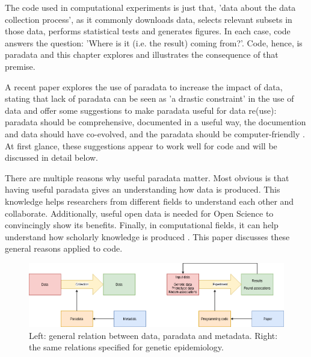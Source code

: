 
The code used in computational experiments is just that, 
'data about the data collection 
process', as it commonly downloads data,
selects relevant subsets in those data,
performs statistical tests and generates figures.
In each case, code answers the question: 
'Where is it (i.e. the result) coming from?'.
Code, hence, is paradata and this chapter explores and illustrates the
consequence of that premise.


A recent paper explores the use of paradata to increase the impact of data,
stating that lack of paradata can be seen as 'a drastic constraint'
in the use of data and offer some suggestions to 
make paradata useful for data re(use):
paradata should be comprehensive, documented in a useful way, 
the documention and data should have co-evolved, 
and the paradata should be computer-friendly \cite{huvila2022improving}.
At first glance, these suggestions appear to work well for code
and will be discussed in detail below.


There are multiple reasons why useful paradata matter. 
Most obvious is that having useful paradata gives an understanding how
data is produced.
This knowledge helps researchers from different fields to understand each other
and collaborate.
Additionally, useful open data is needed for Open Science to convincingly show
its benefits.
Finally, in computational fields, 
it can help understand how scholarly knowledge is produced
\cite{huvila2022improving}.
This paper discusses these general reasons applied to code.

\begin{figure}[!htbp]
  \centering
  \includegraphics[width=\linewidth]{figure_1.png}
  \caption{
    Left: general relation between data, paradata and metadata.
    Right: the same relations specified for genetic epidemiology.
  }
  \label{fig:figure_1}
\end{figure}

